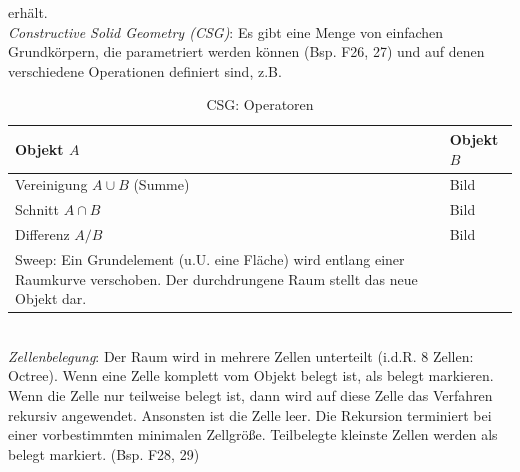 erhält.\\
\textit{Constructive Solid Geometry (CSG)}:
Es gibt eine Menge von einfachen Grundkörpern, die parametriert
werden können (Bsp. F26, 27) und auf denen verschiedene Operationen definiert sind, z.B.
\begin{table}[hbt]
\centering
\begin{tabular}{|p{6.5cm}|p{6.5cm}|}
\hline
Objekt $A$ & Objekt $B$\\
\hline
Vereinigung $A \cup B$ (Summe) & Bild\\
\hline
Schnitt $A \cap B$ & Bild \\
\hline
Differenz $A / B$ & Bild\\
\hline
Sweep:
Ein Grundelement (u.U. eine Fläche) wird entlang einer Raumkurve
verschoben. Der durchdrungene Raum stellt das neue Objekt dar. & \\
\hline
\end{tabular}
\caption{CSG: Operatoren}
\label{tab:csg_ops}
\end{table}\\ 
\textit{Zellenbelegung}:
Der Raum wird in mehrere Zellen unterteilt (i.d.R. 8 Zellen: \glqq Octree\grqq{}).
Wenn eine Zelle komplett vom Objekt belegt ist, als \glqq belegt\grqq{} markieren.
Wenn die Zelle nur teilweise belegt ist, dann wird auf diese Zelle das
Verfahren rekursiv angewendet. Ansonsten ist die Zelle leer.
Die Rekursion terminiert bei einer vorbestimmten minimalen Zellgröße.
Teilbelegte kleinste Zellen werden als belegt markiert. (Bsp. F28, 29)
